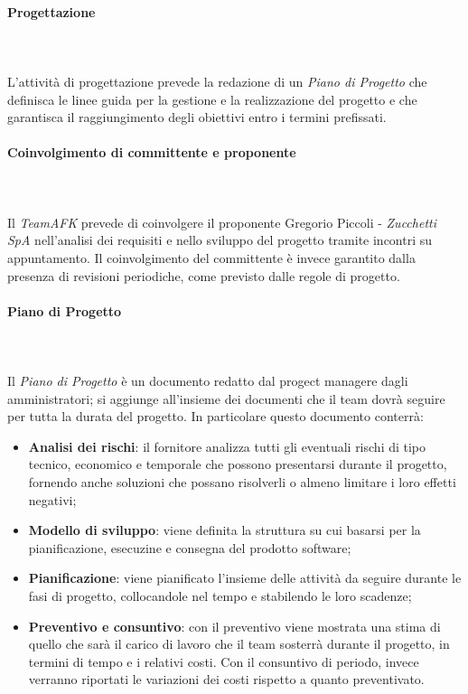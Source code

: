 			\paragraph{Progettazione} \mbox{} \\ \mbox{} \\
			L'attività di progettazione prevede la redazione di un \textit{Piano di Progetto} che definisca le linee guida per la gestione e la realizzazione del progetto e che garantisca il raggiungimento degli obiettivi entro i termini prefissati.	
			
			\paragraph*{Coinvolgimento di committente e proponente}	\mbox{} \\ \mbox{} \\
			Il \textit{TeamAFK} prevede di coinvolgere il proponente Gregorio Piccoli - \textit{Zucchetti SpA} nell'analisi dei requisiti e nello sviluppo del progetto tramite incontri su appuntamento. Il coinvolgimento del committente è invece garantito dalla presenza di revisioni periodiche, come previsto dalle regole di progetto.		
			
			\paragraph*{Piano di Progetto} \mbox{} \\ \mbox{} \\
			Il \textit{Piano di Progetto} è un documento redatto dal progect manager\glo e dagli amministratori; si aggiunge all'insieme dei documenti che il team dovrà seguire per tutta la durata del progetto. In particolare questo documento conterrà:
			\begin{itemize}
				\item \textbf{Analisi dei rischi}: il fornitore analizza tutti gli eventuali rischi di tipo tecnico, economico e temporale che possono presentarsi durante il progetto, fornendo anche soluzioni che possano risolverli o almeno limitare i loro effetti negativi;
				\item \textbf{Modello di sviluppo}: viene definita la struttura su cui basarsi per la pianificazione, esecuzine e consegna del prodotto software;
				\item \textbf{Pianificazione}: viene pianificato l'insieme delle attività da seguire durante le fasi di progetto, collocandole nel tempo e stabilendo le loro scadenze;
				\item \textbf{Preventivo e consuntivo}: con il preventivo viene mostrata una stima di quello che sarà il carico di lavoro che il team sosterrà durante il progetto, in termini di tempo e i relativi costi. Con il consuntivo di periodo, invece verranno riportati le variazioni dei costi rispetto a quanto preventivato.
			\end{itemize}
